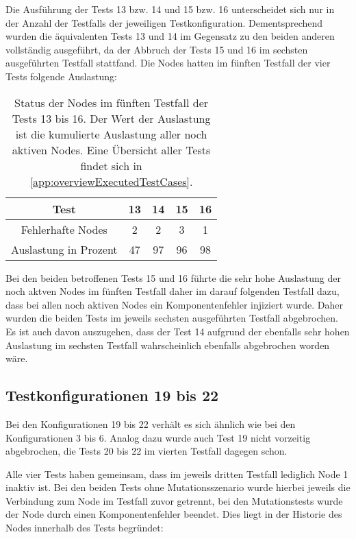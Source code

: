 Die Ausführung der \glspl{Test} 13 bzw. 14 und 15 bzw. 16 unterscheidet sich nur in der Anzahl der \glspl{Testfall} der jeweiligen Testkonfiguration.
Dementsprechend wurden die äquivalenten \glspl{Test} 13 und 14 im Gegensatz zu den beiden anderen vollständig ausgeführt, da der Abbruch der \glspl{Test} 15 und 16 im sechsten ausgeführten \gls{Testfall} stattfand.
Die Nodes hatten im fünften \gls{Testfall} der vier \glspl{Test} folgende Auslastung:

\begin{table}[h]
    \begin{tabular}{c|cccc}
    	        \gls{Test}          & 13 & 14 & 15 & 16 \\ \hline
    	  Fehlerhafte Nodes   & 2  & 2  & 3  & 1  \\
    	Auslastung in Prozent & 47 & 97 & 96 & 98
    \end{tabular}
    \caption[Status der Nodes im fünften \gls{Testfall} der \glspl{Test} 13 bis 16]
    {Status der Nodes im fünften \gls{Testfall} der \glspl{Test} 13 bis 16.
    Der Wert der Auslastung ist die kumulierte Auslastung aller noch aktiven Nodes.
    Eine Übersicht aller Tests findet sich in \cref{app:overviewExecutedTestCases}.}
    \label{tab:loadTests1316}
\end{table}

Bei den beiden betroffenen \glspl{Test} 15 und 16 führte die sehr hohe Auslastung der noch aktven Nodes im fünften \gls{Testfall} daher im darauf folgenden \gls{Testfall} dazu, dass bei allen noch aktiven Nodes ein Komponentenfehler injiziert wurde.
Daher wurden die beiden \glspl{Test} im jeweils sechsten ausgeführten \gls{Testfall} abgebrochen.
Es ist auch davon auszugehen, dass der \gls{Test} 14 aufgrund der ebenfalls sehr hohen Auslastung im sechsten \gls{Testfall} wahrscheinlich ebenfalls abgebrochen worden wäre.

\subsection{Testkonfigurationen 19 bis 22}
\label{subsec:noReconf1922}

Bei den Konfigurationen 19 bis 22 verhält es sich ähnlich wie bei den Konfigurationen 3 bis 6.
Analog dazu wurde auch \gls{Test} 19 nicht vorzeitig abgebrochen, die \glspl{Test} 20 bis 22 im vierten \gls{Testfall} dagegen schon.

Alle vier \glspl{Test} haben gemeinsam, dass im jeweils dritten \gls{Testfall} lediglich Node 1 inaktiv ist.
Bei den beiden \glspl{Test} ohne Mutationsszenario wurde hierbei jeweils die Verbindung zum Node im \gls{Testfall} zuvor getrennt, bei den Mutationstests wurde der Node durch einen Komponentenfehler beendet.
Dies liegt in der Historie des Nodes innerhalb des \glspl{Test} begründet:

